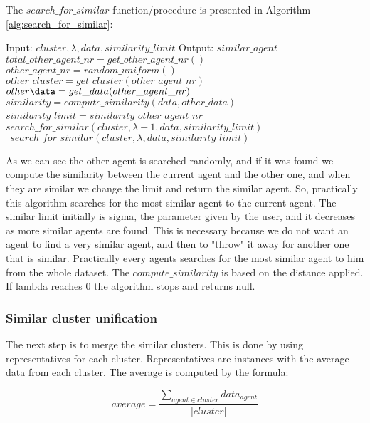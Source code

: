 \documentclass[conference]{IEEEtran}
\begin{document}
The $search\_for\_similar$ function/procedure is presented in Algorithm \ref{alg:search_for_similar}:


\scriptsize
\begin{algorithm}
\caption{$search\_for\_similar$}
\label{alg:search_for_similar}
\begin{algorithmic}[1]
\STATE Input: $cluster, \lambda, data, similarity{\_}limit$
\STATE Output: $similar{\_}agent$
\STATE $total{\_}other{\_}agent{\_}nr = get{\_}other{\_}agent{\_}nr()$
\STATE $other{\_}agent{\_}nr = random{\_}uniform()$
\STATE $other{\_}cluster = get{\_}cluster(other{\_}agent{\_}nr)$
	\STATE $other{\data} = get{\_}data(other{\_}agent{\_}nr)$
	\STATE $similarity=compute{\_}similarity(data, other{\_}data)$
		\STATE $similarity{\_}limit = similarity$
		\RETURN $other{\_}agent{\_}nr$
	\ELSE
		\RETURN $search{\_}for{\_}similar(cluster, \lambda-1, data, similarity{\_}limit)$
	\ENDIF
\ELSE
	\RETURN
	\STATE $ ~ ~search{\_}for{\_}similar(cluster, \lambda, data, similarity{\_}limit)$
\ENDIF
\end{algorithmic}
\end{algorithm}
\normalsize

As we can see the other agent is searched randomly, and if it was found we compute the similarity between the current agent and the other one, and when they are similar we change the limit and return the similar agent. So, practically this algorithm searches for the most similar agent to the current agent. The similar limit initially is sigma, the parameter given by the user, and it decreases as more similar agents are found. This is necessary because we do not want an agent to find a very similar agent, and then to "throw" it away for another one that is similar. Practically every agents searches for the most similar agent to him from the whole dataset.
The $compute{\_}similarity$ is based on the distance applied. If lambda reaches 0 the algorithm stops and returns null.

\subsubsection{Similar cluster unification}

The next step is to merge the similar clusters. This is done by using representatives for each cluster. Representatives are instances with the average data from each cluster. The average is computed by the formula:

\begin{equation}
	average = \frac{\displaystyle\sum_{agent \in cluster} data_{agent}}{|cluster|}
\end{equation}
\end{document}
